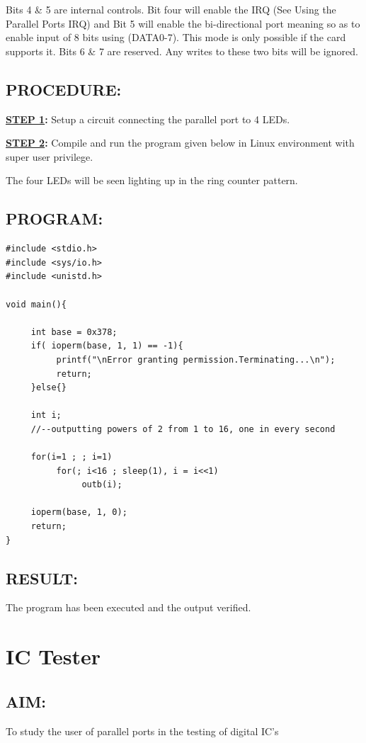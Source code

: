 \documentclass[a4paper,28pt]{report}
\begin{document}
Bits 4 \& 5 are internal controls. Bit four will enable the IRQ (See Using the Parallel Ports IRQ) and Bit 5 will enable the bi-directional port meaning so as to enable input of 8 bits using (DATA0-7). This mode is only possible if the card supports it. Bits 6 \& 7 are reserved. Any writes to these two bits will be ignored. 

\section*{PROCEDURE:}
\textbf{\underline{STEP 1}:} 
Setup a circuit connecting the parallel port to 4 LEDs.

\textbf{\underline{STEP 2}:} Compile and run the program given below in Linux environment with super user privilege.

The four LEDs will be seen lighting up in the ring counter pattern.

\section*{PROGRAM:}
\begin{lstlisting}
#include <stdio.h>
#include <sys/io.h>
#include <unistd.h>

void main(){

     int base = 0x378;
     if( ioperm(base, 1, 1) == -1){
          printf("\nError granting permission.Terminating...\n");
          return;
     }else{}
     
     int i;
     //--outputting powers of 2 from 1 to 16, one in every second
     
     for(i=1 ; ; i=1)
          for(; i<16 ; sleep(1), i = i<<1)
               outb(i);
     
     ioperm(base, 1, 0);
     return;  
}
\end{lstlisting}

\section*{RESULT:}
The program has been executed and the output verified.
%
%
%
%
\chapter{IC Tester}
%
%
\section*{AIM:}
To study the user of parallel ports in the testing of digital IC's
\end{document}
